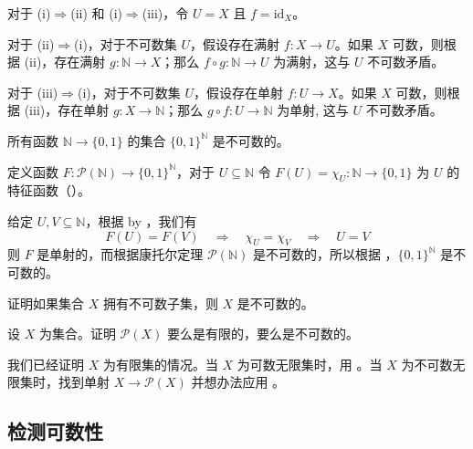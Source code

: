 \begin{cproof}
对于 (i)$\Rightarrow$(ii) 和 (i)$\Rightarrow$(iii)，令 $U=X$ 且 $f=\mathrm{id}_X$。

对于 (ii)$\Rightarrow$(i)，对于不可数集 $U$，假设存在满射 $f : X \to U$。如果 $X$ 可数，则根据 (ii)，存在满射 $g : \mathbb{N} \to X$；那么 $f \circ g : \mathbb{N} \to U$ 为满射，这与 $U$ 不可数矛盾。

对于 (iii)$\Rightarrow$(i)，对于不可数集 $U$，假设存在单射 $f : U \to X$。如果 $X$ 可数，则根据 (iii)，存在单射 $g : X \to \mathbb{N}$；那么 $g \circ f : U \to \mathbb{N}$ 为单射, 这与 $U$ 不可数矛盾。
\end{cproof}

\begin{proposition}
\label{propBinarySequencesAreUncountable}
所有函数 $\mathbb{N} \to \{0,1\}$ 的集合 $\{0,1\}^{\mathbb{N}}$ 是不可数的。
\end{proposition}

\begin{cproof}
定义函数 $F : \mathcal{P}(\mathbb{N}) \to \{0,1\}^{\mathbb{N}}$，对于 $U \subseteq \mathbb{N}$ 令 $F(U) = \chi_U : \mathbb{N} \to \{0,1\}$ 为 $U$ 的特征函数（）。

给定 $U, V \subseteq \mathbb{N}$，根据 by ，我们有
\[ F(U) = F(V) \quad \Rightarrow \quad \chi_U = \chi_V \quad \Rightarrow \quad U = V \]
则 $F$ 是单射的，而根据康托尔定理 $\mathcal{P}(\mathbb{N})$ 是不可数的，所以根据 ，$\{0,1\}^{\mathbb{N}}$ 是不可数的。
\end{cproof}

\begin{exercise}
证明如果集合 $X$ 拥有不可数子集，则 $X$ 是不可数的。
\end{exercise}

\begin{exercise}
\label{exPowerSetFiniteOrUncountable}
设 $X$ 为集合。证明 $\mathcal{P}(X)$ 要么是有限的，要么是不可数的。
\begin{backhint}
我们已经证明 $X$ 为有限集的情况。当 $X$ 为可数无限集时，用 。当 $X$ 为不可数无限集时，找到单射 $X \to \mathcal{P}(X)$ 并想办法应用 。
\end{backhint}
\end{exercise}

\subsection*{检测可数性}

